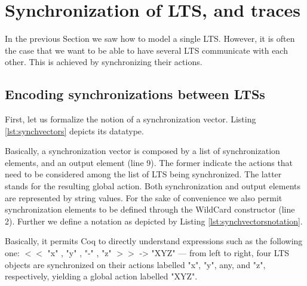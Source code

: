 \section{Synchronization of LTS, and traces}
\label{sec:pnet}


	In the previous Section we saw how to model a single \ac{LTS}. However, it is often the case
	that we want to be able to have several \ac{LTS} communicate with each other.	This is achieved
	by synchronizing their \textsf{actions}.


\subsection{Encoding synchronizations between LTSs}	
\label{sub:synchencode}	
	
	
		First, let us formalize the notion of a synchronization vector. Listing \ref{lst:synchvectors}
	depicts its datatype.	
	
			

	\noindent Basically, a synchronization vector is composed by a list of synchronization elements,
	and an output element (line 9). The former indicate the \textsf{actions} that need to be considered among
	the list of \ac{LTS} being synchronized. The latter stands for the resulting global action.  
	Both synchronization and output elements are represented by string values. For the sake of convenience
	we also permit synchronization elements to be defined through the \textsf{WildCard} constructor (line 2).
	Further we define a notation as depicted by Listing \ref{lst:synchvectorsnotation}.
	
		
                      	
    \noindent Basically, it permits Coq to directly understand expressions such 
    as the following one: \textsf{$<<$ "x" , "y" , "-" , "z" $>>$ -> "XYZ"} --- from left to right,
    four \textsf{LTS} objects are synchronized on their \textsf{actions} labelled \textsf{"x"}, \textsf{"y"}, any,
    and \textsf{"z"}, respectively, yielding a global \textsf{action} labelled \textsf{"XYZ"}.

